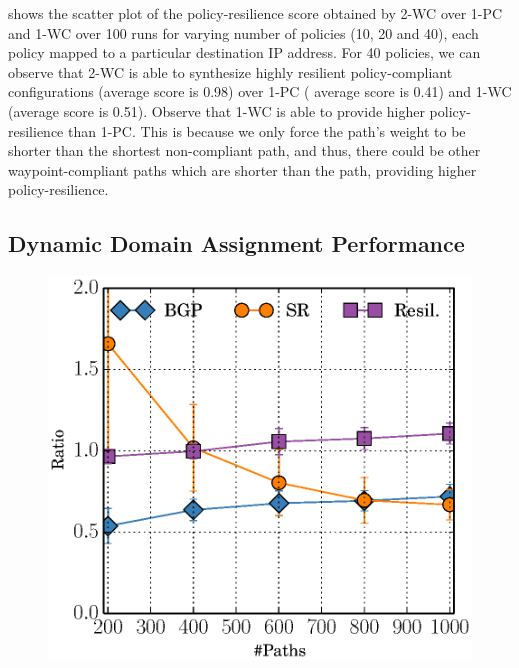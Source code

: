  shows the scatter plot of the policy-resilience 
score obtained by 2-WC over 1-PC and 1-WC over 100 runs
for varying number of policies (10, 20 and 40), each policy mapped 
to a particular destination IP address. 
For 40 policies, 
we can observe that 2-WC is able to synthesize highly
resilient policy-compliant configurations 
(average score is 0.98) over 1-PC (
average score is 0.41) and 1-WC (average score is 0.51). 
Observe that 
1-WC is able to provide higher policy-resilience than
1-PC. This is because we only
force the \name path's weight to 
be shorter than the shortest 
non-compliant path, and thus, there could be
other waypoint-compliant paths which are 
shorter than the  
\name path, 
providing higher policy-resilience.

\begin{figure}
	\centering
\end{figure}
%	


\subsection{Dynamic Domain Assignment Performance} \label{sec:mcmceval}
\begin{figure}
	\includegraphics[width=0.29\columnwidth]{figures/ratioMCMC.eps}
\end{figure}

